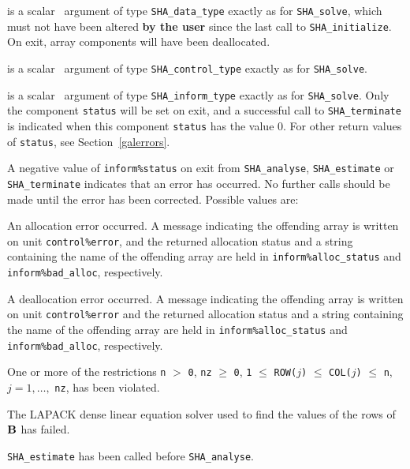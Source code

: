 \documentclass{galahad}
\newcommand{\packagename}{SHA}
\begin{document}
\vspace*{-1mm}
\begin{description}

 is a scalar \intentinout\ argument of type 
{\tt \packagename\_data\_type} 
exactly as for
{\tt \packagename\_solve},
which must not have been altered {\bf by the user} since the last call to 
{\tt \packagename\_initialize}.
On exit, array components will have been deallocated.

 is a scalar \intentin\ argument of type 
{\tt \packagename\_control\_type}
exactly as for
{\tt \packagename\_solve}.

 is a scalar \intentout\ argument of type
{\tt \packagename\_inform\_type}
exactly as for
{\tt \packagename\_solve}.
Only the component {\tt status} will be set on exit, and a 
successful call to 
{\tt \packagename\_terminate}
is indicated when this  component {\tt status} has the value 0. 
For other return values of {\tt status}, see Section~\ref{galerrors}.

\end{description}


\galerrors
A negative value of {\tt inform\%status} on exit from 
{\tt \packagename\_analyse},
{\tt \packagename\_estimate}
or 
{\tt \packagename\_terminate}
indicates that an error has occurred. No further calls should be made
until the error has been corrected. Possible values are:

\begin{description}

 An allocation error occurred. 
A message indicating the offending
array is written on unit {\tt control\%error}, and the returned allocation 
status and a string containing the name of the offending array
are held in {\tt inform\%alloc\_\-status}
and {\tt inform\%bad\_alloc}, respectively.

 A deallocation error occurred. 
A message indicating the offending 
array is written on unit {\tt control\%error} and the returned allocation 
status and a string containing the name of the offending array
are held in {\tt inform\%alloc\_\-status}
and {\tt inform\%bad\_alloc}, respectively.

One or more of the restrictions
{\tt n} $>$ {\tt 0},  {\tt nz} $\ge$ {\tt 0}, 
{\tt 1} $\le$ {\tt ROW(}$j${\tt )} $\le$ {\tt COL(}$j${\tt )} $\le$ {\tt n}, 
$j = 1, \ldots,$ {\tt nz},
has been violated.

The LAPACK dense linear equation solver used to find the values of
the rows of ${\mathbf{B}}$ has failed.

  {\tt \packagename\_estimate} has been called
before {\tt \packagename\_analyse}. 

\end{description}
\end{document}

